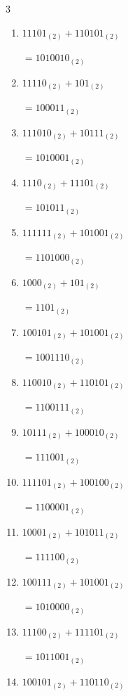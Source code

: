 \begin{multicols}{3}
\begin{enumerate}
  \item $11101_{(2)} + 110101_{(2)}$

        $=1010010_{(2)}$

  \item $11110_{(2)} + 101_{(2)}$

        $=100011_{(2)}$

  \item $111010_{(2)} + 10111_{(2)}$

        $=1010001_{(2)}$

\columnbreak %

  \item $1110_{(2)} + 11101_{(2)}$

        $=101011_{(2)}$

  \item $111111_{(2)} + 101001_{(2)}$

        $=1101000_{(2)}$

  \item $1000_{(2)} + 101_{(2)}$

        $=1101_{(2)}$

  \item $100101_{(2)} + 101001_{(2)}$

        $=1001110_{(2)}$

  \item $110010_{(2)} + 110101_{(2)}$

        $=1100111_{(2)}$

  \item $10111_{(2)} + 100010_{(2)}$

        $=111001_{(2)}$

  \item $111101_{(2)} + 100100_{(2)}$

        $=1100001_{(2)}$

  \item $10001_{(2)} + 101011_{(2)}$

        $=111100_{(2)}$

  \item $100111_{(2)} + 101001_{(2)}$

        $=1010000_{(2)}$

  \item $11100_{(2)} + 111101_{(2)}$

        $=1011001_{(2)}$

\columnbreak %

\resetques

  \item $100101_{(2)} + 110110_{(2)}$


\end{enumerate}
\end{multicols}
